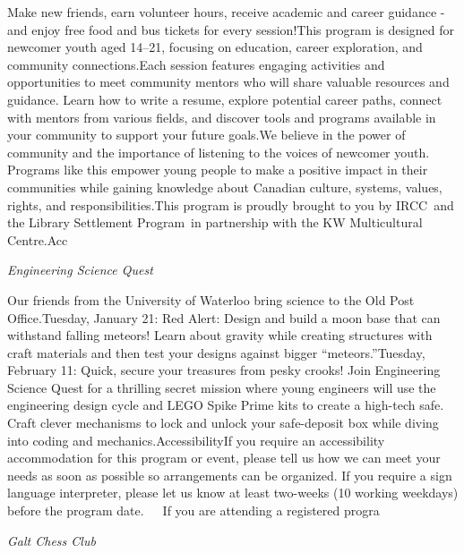 \documentclass[letterpaper, 10pt]{article}
\newcommand{\subtitle}[1]{\textit{\large #1}\vspace{0.5em}}
\newcommand{\articlecontent}[1]{\small #1\vspace{1em}}
\begin{document}
\begin{multicols}{2}
{Make new friends, earn volunteer hours, receive academic and career guidance - and enjoy free food and bus tickets for every session!This program is designed for newcomer youth aged 14–21, focusing on education, career exploration, and community connections.Each session features engaging activities and opportunities to meet community mentors who will share valuable resources and guidance. Learn how to write a resume, explore potential career paths, connect with mentors from various fields, and discover tools and programs available in your community to support your future goals.We believe in the power of community and the importance of listening to the voices of newcomer youth. Programs like this empower young people to make a positive impact in their communities while gaining knowledge about Canadian culture, systems, values, rights, and responsibilities.This program is proudly brought to you by IRCC and the Library Settlement Program in partnership with the KW Multicultural Centre.Acc
}
\vspace{10px}

\subtitle{Engineering Science Quest}

\articlecontent{

\qrcode[height=1.5cm]{https://ideaexchange.libnet.info/event/12544677}
\vspace{10px}

Our friends from the University of Waterloo bring science to the Old Post Office.Tuesday, January 21: Red Alert: Design and build a moon base that can withstand falling meteors! Learn about gravity while creating structures with craft materials and then test your designs against bigger “meteors.”Tuesday, February 11: Quick, secure your treasures from pesky crooks! Join Engineering Science Quest for a thrilling secret mission where young engineers will use the engineering design cycle and LEGO Spike Prime kits to create a high-tech safe. Craft clever mechanisms to lock and unlock your safe-deposit box while diving into coding and mechanics.AccessibilityIf you require an accessibility accommodation for this program or event, please tell us how we can meet your needs as soon as possible so arrangements can be organized. If you require a sign language interpreter, please let us know at least two-weeks (10 working weekdays) before the program date.   If you are attending a registered progra
}
\vspace{10px}

\subtitle{Galt Chess Club}

\articlecontent{

}
\end{multicols}
\end{document}
